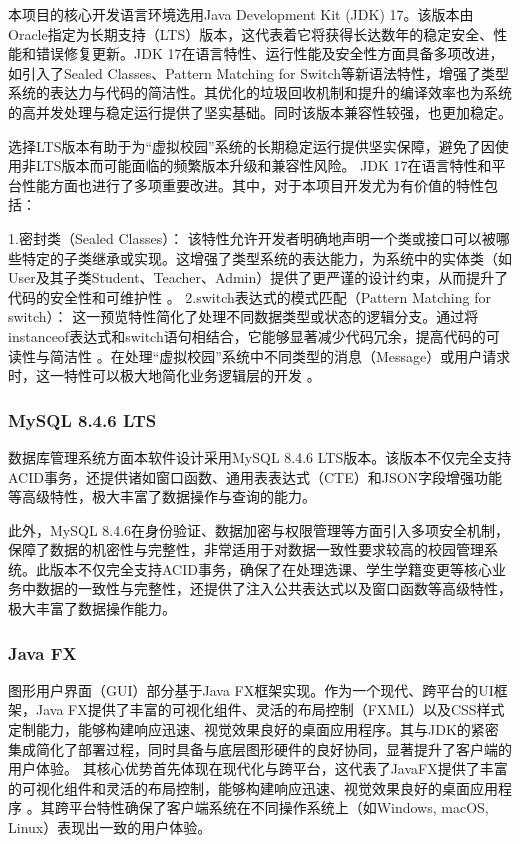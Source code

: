 本项目的核心开发语言环境选用Java Development Kit (JDK) 17。该版本由Oracle指定为长期支持（LTS）版本，这代表着它将获得长达数年的稳定安全、性能和错误修复更新。JDK 17在语言特性、运行性能及安全性方面具备多项改进，如引入了Sealed Classes、Pattern Matching for Switch等新语法特性，增强了类型系统的表达力与代码的简洁性。其优化的垃圾回收机制和提升的编译效率也为系统的高并发处理与稳定运行提供了坚实基础。同时该版本兼容性较强，也更加稳定。

选择LTS版本有助于为“虚拟校园”系统的长期稳定运行提供坚实保障，避免了因使用非LTS版本而可能面临的频繁版本升级和兼容性风险。 JDK 17在语言特性和平台性能方面也进行了多项重要改进。其中，对于本项目开发尤为有价值的特性包括：

1.密封类（Sealed Classes）： 该特性允许开发者明确地声明一个类或接口可以被哪些特定的子类继承或实现。这增强了类型系统的表达能力，为系统中的实体类（如User及其子类Student、Teacher、Admin）提供了更严谨的设计约束，从而提升了代码的安全性和可维护性 。
2.switch表达式的模式匹配（Pattern Matching for switch）： 这一预览特性简化了处理不同数据类型或状态的逻辑分支。通过将instanceof表达式和switch语句相结合，它能够显著减少代码冗余，提高代码的可读性与简洁性 。在处理“虚拟校园”系统中不同类型的消息（Message）或用户请求时，这一特性可以极大地简化业务逻辑层的开发 。

\subsubsection{MySQL 8.4.6 LTS}

数据库管理系统方面本软件设计采用MySQL 8.4.6 LTS版本。该版本不仅完全支持ACID事务，还提供诸如窗口函数、通用表表达式（CTE）和JSON字段增强功能等高级特性，极大丰富了数据操作与查询的能力。

此外，MySQL 8.4.6在身份验证、数据加密与权限管理等方面引入多项安全机制，保障了数据的机密性与完整性，非常适用于对数据一致性要求较高的校园管理系统。此版本不仅完全支持ACID事务，确保了在处理选课、学生学籍变更等核心业务中数据的一致性与完整性，还提供了注入公共表达式以及窗口函数等高级特性，极大丰富了数据操作能力。

\subsubsection{Java FX}

图形用户界面（GUI）部分基于Java FX框架实现。作为一个现代、跨平台的UI框架，Java FX提供了丰富的可视化组件、灵活的布局控制（FXML）以及CSS样式定制能力，能够构建响应迅速、视觉效果良好的桌面应用程序。其与JDK的紧密集成简化了部署过程，同时具备与底层图形硬件的良好协同，显著提升了客户端的用户体验。
其核心优势首先体现在现代化与跨平台，这代表了JavaFX提供了丰富的可视化组件和灵活的布局控制，能够构建响应迅速、视觉效果良好的桌面应用程序 。其跨平台特性确保了客户端系统在不同操作系统上（如Windows, macOS, Linux）表现出一致的用户体验。

